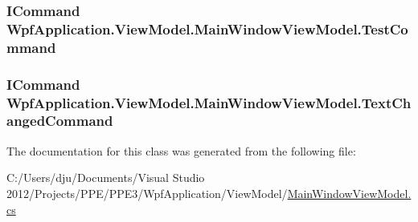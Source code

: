 \hypertarget{class_wpf_application_1_1_view_model_1_1_main_window_view_model_a7c28181152e62d237a59d2f778c7ef0c}{
\subsubsection[{Test\-Command}]{\setlength{\rightskip}{0pt plus 5cm}I\-Command Wpf\-Application.\-View\-Model.\-Main\-Window\-View\-Model.\-Test\-Command\hspace{0.3cm}{\ttfamily [get]}}}\label{class_wpf_application_1_1_view_model_1_1_main_window_view_model_a7c28181152e62d237a59d2f778c7ef0c}
\hypertarget{class_wpf_application_1_1_view_model_1_1_main_window_view_model_a86bb2a58cef68a1dd3d1a9c8d403221b}{
\subsubsection[{Text\-Changed\-Command}]{\setlength{\rightskip}{0pt plus 5cm}I\-Command Wpf\-Application.\-View\-Model.\-Main\-Window\-View\-Model.\-Text\-Changed\-Command\hspace{0.3cm}{\ttfamily [get]}}}\label{class_wpf_application_1_1_view_model_1_1_main_window_view_model_a86bb2a58cef68a1dd3d1a9c8d403221b}


The documentation for this class was generated from the following file\-:\begin{DoxyCompactItemize}
\item 
C\-:/\-Users/dju/\-Documents/\-Visual Studio 2012/\-Projects/\-P\-P\-E/\-P\-P\-E3/\-Wpf\-Application/\-View\-Model/\hyperlink{_main_window_view_model_8cs}{Main\-Window\-View\-Model.\-cs}\end{DoxyCompactItemize}
